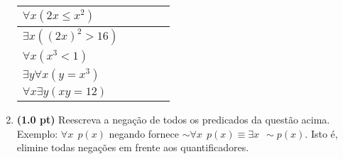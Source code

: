 \documentclass[a4paper,12pt]{article}
\begin{document}
\begin{enumerate}
\begin{center}
\begin{tabular}{l|l|l|l|l}
$\forall x (2x \leq x^2)$ & & & & \\ \hline
$\exists x ((2x)^2 > 16)$ & & & & \\ \hline
$\forall x (x^3 < 1)$ & & & & \\ \hline
$\exists y \forall x (y = x^3)$ & & & & \\ \hline
$\forall x \exists y (xy = 12)$ & & & & \\ \hline \hline
\end{tabular}
\end{center}


\item  {\bf (1.0 pt)} Reescreva a negação de todos os predicados 
da questão acima. Exemplo: $\forall x \:\: p(x)$ negando
fornece $\sim \forall x \:\: p(x) \equiv  \exists x \:\: \sim p(x)$.
Isto é, elimine todas  negações em frente aos quantificadores.





\end{enumerate}
\end{document}
